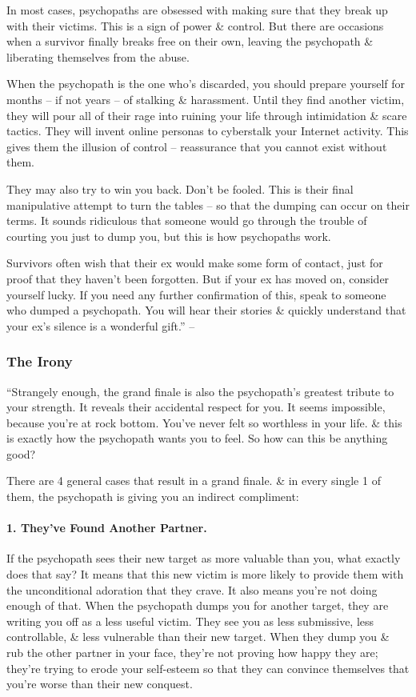 \documentclass{article}
\numberwithin{equation}{section}
\begin{document}
In most cases, psychopaths are obsessed with making sure that they break up with their victims. This is a sign of power \& control. But there are occasions when a survivor finally breaks free on their own, leaving the psychopath \& liberating themselves from the abuse.

When the psychopath is the one who's discarded, you should prepare yourself for months -- if not years -- of stalking \& harassment. Until they find another victim, they will pour all of their rage into ruining your life through intimidation \& scare tactics. They will invent online personas to cyberstalk your Internet activity. This gives them the illusion of control -- reassurance that you cannot exist without them.

They may also try to win you back. Don't be fooled. This is their final manipulative attempt to turn the tables -- so that the dumping can occur on their terms. It sounds ridiculous that someone would go through the trouble of courting you just to dump you, but this is how psychopaths work.

Survivors often wish that their ex would make some form of contact, just for proof that they haven't been forgotten. But if your ex has moved on, consider yourself lucky. If you need any further confirmation of this, speak to someone who dumped a psychopath. You will hear their stories \& quickly understand that your ex's silence is a wonderful gift.'' -- \cite[pp. 82--83]{MacKenzie2015}

\subsubsection{The Irony}
``Strangely enough, the grand finale is also the psychopath's greatest tribute to your strength. It reveals their accidental respect for you. It seems impossible, because you're at rock bottom. You've never felt so worthless in your life. \& this is exactly how the psychopath wants you to feel. So how can this be anything good?

There are 4 general cases that result in a grand finale. \& in every single 1 of them, the psychopath is giving you an indirect compliment:

\paragraph{1. They've Found Another Partner.} If the psychopath sees their new target as more valuable than you, what exactly does that say? It means that this new victim is more likely to provide them with the unconditional adoration that they crave. It also means you're not doing enough of that. When the psychopath dumps you for another target, they are writing you off as a less useful victim. They see you as less submissive, less controllable, \& less vulnerable than their new target. When they dump you \& rub the other partner in your face, they're not proving how happy they are; they're trying to erode your self-esteem so that they can convince themselves that you're worse than their new conquest.
\end{document}

